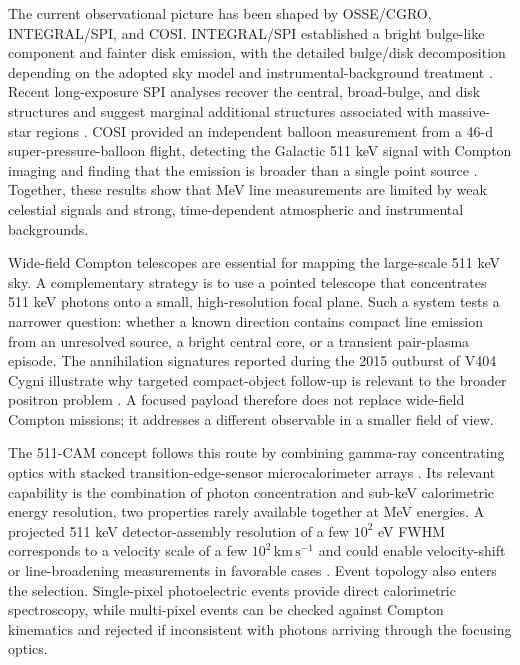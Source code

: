 \documentclass[preprint,12pt]{elsarticle}
\begin{document}
The current observational picture has been shaped by OSSE/CGRO, INTEGRAL/SPI, and COSI. INTEGRAL/SPI established a bright bulge-like component and fainter disk emission, with the detailed bulge/disk decomposition depending on the adopted sky model and instrumental-background treatment \cite{Siegert2016AA,Yoneda2025}. Recent long-exposure SPI analyses recover the central, broad-bulge, and disk structures and suggest marginal additional structures associated with massive-star regions \cite{Yoneda2025}. COSI provided an independent balloon measurement from a 46-d super-pressure-balloon flight, detecting the Galactic 511 keV signal with Compton imaging and finding that the emission is broader than a single point source \cite{Kierans2020,Siegert2020COSI}. Together, these results show that MeV line measurements are limited by weak celestial signals and strong, time-dependent atmospheric and instrumental backgrounds.

Wide-field Compton telescopes are essential for mapping the large-scale 511 keV sky. A complementary strategy is to use a pointed telescope that concentrates 511 keV photons onto a small, high-resolution focal plane. Such a system tests a narrower question: whether a known direction contains compact line emission from an unresolved source, a bright central core, or a transient pair-plasma episode. The annihilation signatures reported during the 2015 outburst of V404 Cygni illustrate why targeted compact-object follow-up is relevant to the broader positron problem \cite{Siegert2016V404}. A focused payload therefore does not replace wide-field Compton missions; it addresses a different observable in a smaller field of view.

The 511-CAM concept follows this route by combining gamma-ray concentrating optics with stacked transition-edge-sensor microcalorimeter arrays \cite{Shirazi2023}. Its relevant capability is the combination of photon concentration and sub-keV calorimetric energy resolution, two properties rarely available together at MeV energies. A projected 511 keV detector-assembly resolution of a few $10^2$ eV FWHM corresponds to a velocity scale of a few $10^2\,\mathrm{km\,s^{-1}}$ and could enable velocity-shift or line-broadening measurements in favorable cases \cite{Shirazi2023}. Event topology also enters the selection. Single-pixel photoelectric events provide direct calorimetric spectroscopy, while multi-pixel events can be checked against Compton kinematics and rejected if inconsistent with photons arriving through the focusing optics.
\end{document}

